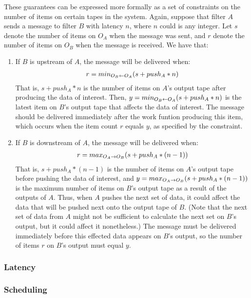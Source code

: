 These guarantees can be expressed more formally as a set of
constraints on the number of items on certain tapes in the system.
Again, suppose that filter $A$ sends a message to filter $B$ with
latency $n$, where $n$ could is any integer.  Let $s$ denote the
number of items on $O_A$ when the message was sent, and $r$ denote the
number of items on $O_B$ when the message is received.  We have that:

\begin{enumerate}

\item If $B$ is upstream of $A$, the message will be delivered when:
\begin{eqnarray}
\label{eq:msgup}
r = min_{O_B \leftarrow O_A}(s + push_A * n)
\end{eqnarray}
That is, $s + push_A * n$ is the number of items on $A$'s output tape
after producing the data of interest.  Then, $y =
min_{O_B \leftarrow O_A}(s + push_A * n)$ is the latest item on $B$'s output
tape that affects the data of interest.  The message should be
delivered immediately after the work funtion producing this item,
which occurs when the item count $r$ equals $y$, as specified by the
constraint.

\item If $B$ is downstream of $A$, the message will be delivered when:
\begin{eqnarray}
\label{eq:msgdown}
r = max_{O_A \rightarrow O_B}(s + push_A * (n-1))
\end{eqnarray}
That is, $s + push_A * (n - 1)$ is the number of items on $A$'s
output tape before pushing the data of interest, and $y =
max_{O_A \rightarrow O_B}(s + push_A * (n-1))$ is the maximum number of items
on $B$'s output tape as a result of the outputs of $A$.  Thus, when
$A$ pushes the next set of data, it could affect the data that will be
pushed next onto the output tape of $B$.  (Note that the next set of
data from $A$ might not be sufficient to calculate the next set on
$B$'s output, but it could affect it nonetheless.)  The message must
be delivered immediately before this effected data appears on $B$'s
output, so the number of items $r$ on $B$'s output must equal $y$.

\end{enumerate}

\subsubsection{Latency}

\subsubsection{Scheduling}

